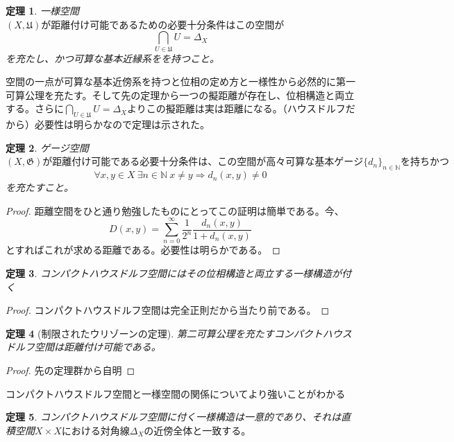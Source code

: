 \documentclass[leqno]{jsarticle}
\newtheorem{thm}{定理}
\begin{document}
\begin{thm}
一様空間$(X,\mathfrak{U})が距離付け可能であるための必要十分条件はこの空間が$
\[
\bigcap_{U\in \mathfrak{U}}U=\Delta_{X} 
\]を充たし、かつ可算な基本近縁系をを持つこと。
\end{thm}空間の一点が可算な基本近傍系を持つと位相の定め方と一様性から必然的に第一可算公理を充たす。そして先の定理から一つの擬距離が存在し、位相構造と両立する。さらに$\displaystyle \bigcap_{U\in \mathfrak{U}}U=\Delta_{X} $よりこの擬距離は実は距離になる。（ハウスドルフだから）必要性は明らかなので定理は示された。
\begin{thm}
ゲージ空間$(X,\mathfrak{G})が距離付け可能である必要十分条件は、
この空間が高々可算な基本ゲージ\{d_{n}\}_{n\in \mathbb{N}}を持ちかつ$
\[
\forall x,y\in X\ \exists n\in \mathbb{N}\ x\neq y\Rightarrow d_{n}(x,y)\neq 0
\]を充たすこと。
\end{thm}
\begin{proof}
距離空間をひと通り勉強したものにとってこの証明は簡単である。今、
\[
D(x,y)=\sum_{n=0}^{\infty}\frac{1}{2^{n}}\frac{d_{n}(x,y)}{1+d_{n}(x,y)}
\]とすればこれが求める距離である。必要性は明らかである。
\end{proof}
\begin{thm}
コンパクトハウスドルフ空間にはその位相構造と両立する一様構造が付く
\end{thm}
\begin{proof}
コンパクトハウスドルフ空間は完全正則だから当たり前である。
\end{proof}
\begin{thm}[制限されたウリゾーンの定理]
第二可算公理を充たすコンパクトハウスドルフ空間は距離付け可能である。
\end{thm}
\begin{proof}
先の定理群から自明
\end{proof}
コンパクトハウスドルフ空間と一様空間の関係についてより強いことがわかる
\begin{thm}
コンパクトハウスドルフ空間に付く一様構造は一意的であり、それは直積空間$X\times Xにおける対角線\Delta_{X}の近傍全体と一致する。$
\end{thm}
\end{document}
